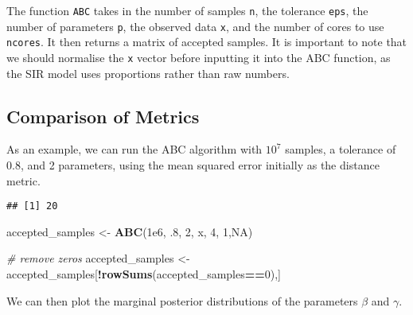 \documentclass[
]{article}
\newenvironment{Shaded}{\begin{snugshade}}{\end{snugshade}}
\newcommand{\CommentTok}[1]{\textcolor[rgb]{0.56,0.35,0.01}{\textit{#1}}}
\newcommand{\ConstantTok}[1]{\textcolor[rgb]{0.56,0.35,0.01}{#1}}
\newcommand{\DecValTok}[1]{\textcolor[rgb]{0.00,0.00,0.81}{#1}}
\newcommand{\FloatTok}[1]{\textcolor[rgb]{0.00,0.00,0.81}{#1}}
\newcommand{\FunctionTok}[1]{\textcolor[rgb]{0.13,0.29,0.53}{\textbf{#1}}}
\newcommand{\NormalTok}[1]{#1}
\newcommand{\OtherTok}[1]{\textcolor[rgb]{0.56,0.35,0.01}{#1}}
\newcommand{\SpecialCharTok}[1]{\textcolor[rgb]{0.81,0.36,0.00}{\textbf{#1}}}
\begin{document}
The function \texttt{ABC} takes in the number of samples \texttt{n}, the
tolerance \texttt{eps}, the number of parameters \texttt{p}, the
observed data \texttt{x}, and the number of cores to use
\texttt{ncores}. It then returns a matrix of accepted samples. It is
important to note that we should normalise the \texttt{x} vector before
inputting it into the ABC function, as the SIR model uses proportions
rather than raw numbers.

\subsection{Comparison of Metrics}\label{comparison-of-metrics}

As an example, we can run the ABC algorithm with \(10^7\) samples, a
tolerance of 0.8, and 2 parameters, using the mean squared error
initially as the distance metric.

\begin{Shaded}
\end{Shaded}

\begin{verbatim}
## [1] 20
\end{verbatim}

\begin{Shaded}
\begin{Highlighting}[]
\NormalTok{accepted\_samples }\OtherTok{\textless{}{-}} \FunctionTok{ABC}\NormalTok{(}\FloatTok{1e6}\NormalTok{, .}\DecValTok{8}\NormalTok{, }\DecValTok{2}\NormalTok{, x, }\DecValTok{4}\NormalTok{, }\DecValTok{1}\NormalTok{,}\ConstantTok{NA}\NormalTok{)}

\CommentTok{\# remove zeros}
\NormalTok{accepted\_samples }\OtherTok{\textless{}{-}}\NormalTok{ accepted\_samples[}\SpecialCharTok{!}\FunctionTok{rowSums}\NormalTok{(accepted\_samples}\SpecialCharTok{==}\DecValTok{0}\NormalTok{),]}
\end{Highlighting}
\end{Shaded}

We can then plot the marginal posterior distributions of the parameters
\(\beta\) and \(\gamma\).
\end{document}

